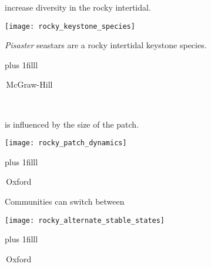 \documentclass[t]{beamer}
\begin{document}
\begin{frame}[t]{ increase diversity in the rocky intertidal.}

	\vspace*{-\baselineskip}

	\begin{center}
		\texttt{[image: rocky\_keystone\_species]} 
	\end{center}

	\vspace*{-0.5\baselineskip}
	
	\textit{Pisaster} seastars are a rocky intertidal keystone species.
	
\vskip0pt plus 1filll

\tiny\textcopyright\,McGraw-Hill

\end{frame}


{
\begin{frame}[b]{}
\tiny\hfill\textcolor{white}{Source unknown.}
\end{frame}
}

\begin{frame}[t]{ is influenced by the size of the patch.}

	\vspace*{-\baselineskip}

	\begin{center}
		\texttt{[image: rocky\_patch\_dynamics]} 
	\end{center}


\vskip0pt plus 1filll

\hfill\tiny\textcopyright\,Oxford

\end{frame}


\begin{frame}[t]{Communities can switch between }

	\vspace*{-\baselineskip}

	\begin{center}
		\texttt{[image: rocky\_alternate\_stable\_states]} 
	\end{center}


\vskip0pt plus 1filll

\hfill\tiny\textcopyright\,Oxford

\end{frame}
\end{document}
